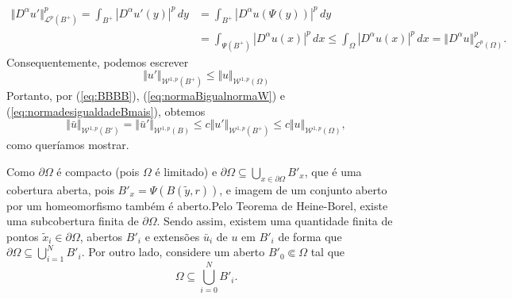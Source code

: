 \documentclass[a4paper, 11pt]{book}
\theoremstyle{definition}
\newcommand{\cL}{\mathcal{L}}
\newcommand{\cW}{\mathcal{W}}
\begin{document}
\begin{prf}
    \[
        \begin{aligned}
            \Vert D^\alpha u' \Vert_{\cL^p(B^+)}^p = \int_{B^+} |D^\alpha u'(y) |^p \,dy &= \int_{B^+} |D^\alpha u (\Psi(y))|^p \,dy\\ &= \int_{\Psi(B^+)} |D^\alpha u(x)|^p \,dx \leqslant \int_{\Omega} |D^\alpha u(x)|^p \,dx = \Vert D^\alpha u \Vert_{\cL^p(\Omega)}^p.
        \end{aligned}
    \]
    Consequentemente, podemos escrever
    \begin{equation} \label{eq:normadesigualdadeBmais}
        \Vert u' \Vert_{\cW^{1,p}(B^+)} \leqslant \Vert u \Vert_{\cW^{1,p}(\Omega)}
    \end{equation}
    Portanto, por (\ref{eq:BBBB}), (\ref{eq:normaBigualnormaW}) e (\ref{eq:normadesigualdadeBmais}), obtemos
    \begin{equation} \label{eq:desigualdadeWO}
        \Vert \bar u \Vert_{\cW^{1,p}(B')} = \Vert \bar u' \Vert_{\cW^{1,p}(B)} \leqslant c \Vert u' \Vert_{\cW^{1,p}(B^+)} \leqslant c \Vert u \Vert_{\cW^{1,p}(\Omega)},
    \end{equation}
    como queríamos mostrar.

    Como $\partial\Omega$ é compacto (pois $\Omega$ é limitado) e $\partial \Omega \subseteq \bigcup_{x \in \partial\Omega} B'_x$,
    que é uma cobertura aberta, pois $B'_x = \Psi(B(\tilde y, r))$, e imagem de um conjunto aberto por um homeomorfismo também é aberto.Pelo Teorema de Heine-Borel, existe uma subcobertura finita de $\partial\Omega$.
    Sendo assim, existem uma quantidade finita de pontos $\tilde x_i \in \partial\Omega$, abertos $B'_i$ e extensões $\bar u_i$ de $u$ em $B'_i$ de forma que $\partial\Omega \subseteq \bigcup_{i=1}^N B'_i$.
    Por outro lado, considere um aberto $B'_0 \Subset \Omega$ tal que
    \[
        \Omega \subseteq \bigcup_{i=0}^N B'_i.
    \]


\end{prf}
\end{document}
